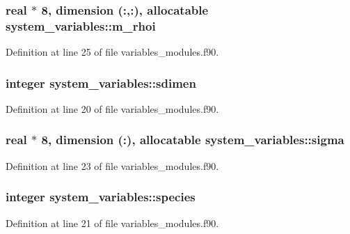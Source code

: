 \subsubsection[{\texorpdfstring{m\+\_\+rhoi}{m_rhoi}}]{\setlength{\rightskip}{0pt plus 5cm}real $\ast$ 8, dimension (\+:,\+:), allocatable system\+\_\+variables\+::m\+\_\+rhoi}\hypertarget{namespacesystem__variables_a4037c2d31c4f9b732833108921967a0d}{}\label{namespacesystem__variables_a4037c2d31c4f9b732833108921967a0d}


Definition at line 25 of file variables\+\_\+modules.\+f90.

\subsubsection[{\texorpdfstring{sdimen}{sdimen}}]{\setlength{\rightskip}{0pt plus 5cm}integer system\+\_\+variables\+::sdimen}\hypertarget{namespacesystem__variables_a6daf314984d1b1af3add98d0183cece5}{}\label{namespacesystem__variables_a6daf314984d1b1af3add98d0183cece5}


Definition at line 20 of file variables\+\_\+modules.\+f90.

\subsubsection[{\texorpdfstring{sigma}{sigma}}]{\setlength{\rightskip}{0pt plus 5cm}real $\ast$ 8, dimension (\+:), allocatable system\+\_\+variables\+::sigma}\hypertarget{namespacesystem__variables_ab27965e02d46e50bab5fa0a5cfc3cab8}{}\label{namespacesystem__variables_ab27965e02d46e50bab5fa0a5cfc3cab8}


Definition at line 23 of file variables\+\_\+modules.\+f90.

\subsubsection[{\texorpdfstring{species}{species}}]{\setlength{\rightskip}{0pt plus 5cm}integer system\+\_\+variables\+::species}\hypertarget{namespacesystem__variables_a5cbe3284a50e8855776c84f6ab36a0b9}{}\label{namespacesystem__variables_a5cbe3284a50e8855776c84f6ab36a0b9}


Definition at line 21 of file variables\+\_\+modules.\+f90.

